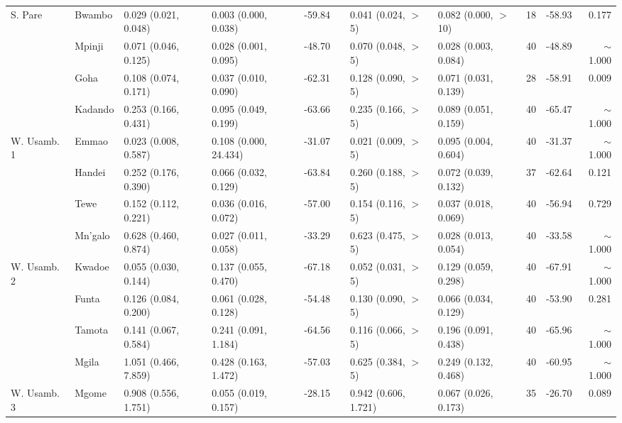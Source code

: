 \begin{tabular}{llllllllclr}
\cmidrule{2-11}
S. Pare     & Bwambo         & 0.029 (0.021, 0.048)   & 0.003 (0.000, 0.038)   & -59.84   & & 0.041 (0.024, $>$5)    & 0.082 (0.000, $>$10)   & 18   & -58.93   & 0.177\\
            & Mpinji         & 0.071 (0.046, 0.125)   & 0.028 (0.001, 0.095)   & -48.70   & & 0.070 (0.048, $>$5)    & 0.028 (0.003, 0.084)   & 40   & -48.89   & $\sim$1.000\\
            & Goha           & 0.108 (0.074, 0.171)   & 0.037 (0.010, 0.090)   & -62.31   & & 0.128 (0.090, $>$5)    & 0.071 (0.031, 0.139)   & 28   & -58.91   & 0.009\\
            & Kadando        & 0.253 (0.166, 0.431)   & 0.095 (0.049, 0.199)   & -63.66   & & 0.235 (0.166, $>$5)    & 0.089 (0.051, 0.159)   & 40   & -65.47   & $\sim$1.000\\
\cmidrule{2-11}
W. Usamb. 1 & Emmao          & 0.023 (0.008, 0.587)   & 0.108 (0.000, 24.434)  & -31.07   & & 0.021 (0.009, $>$5)    & 0.095 (0.004, 0.604)   & 40   & -31.37   & $\sim$1.000\\
            & Handei         & 0.252 (0.176, 0.390)   & 0.066 (0.032, 0.129)   & -63.84   & & 0.260 (0.188, $>$5)    & 0.072 (0.039, 0.132)   & 37   & -62.64   & 0.121\\
            & Tewe           & 0.152 (0.112, 0.221)   & 0.036 (0.016, 0.072)   & -57.00   & & 0.154 (0.116, $>$5)    & 0.037 (0.018, 0.069)   & 40   & -56.94   & 0.729\\
            & Mn'galo        & 0.628 (0.460, 0.874)   & 0.027 (0.011, 0.058)   & -33.29   & & 0.623 (0.475, $>$5)    & 0.028 (0.013, 0.054)   & 40   & -33.58   & $\sim$1.000\\
\cmidrule{2-11}
W. Usamb. 2 & Kwadoe         & 0.055 (0.030, 0.144)   & 0.137 (0.055, 0.470)   & -67.18   & & 0.052 (0.031, $>$5)    & 0.129 (0.059, 0.298)   & 40   & -67.91   & $\sim$1.000\\
            & Funta          & 0.126 (0.084, 0.200)   & 0.061 (0.028, 0.128)   & -54.48   & & 0.130 (0.090, $>$5)    & 0.066 (0.034, 0.129)   & 40   & -53.90   & 0.281\\
            & Tamota         & 0.141 (0.067, 0.584)   & 0.241 (0.091, 1.184)   & -64.56   & & 0.116 (0.066, $>$5)    & 0.196 (0.091, 0.438)   & 40   & -65.96   & $\sim$1.000\\
            & Mgila          & 1.051 (0.466, 7.859)   & 0.428 (0.163, 1.472)   & -57.03   & & 0.625 (0.384, $>$5)    & 0.249 (0.132, 0.468)   & 40   & -60.95   & $\sim$1.000\\
\cmidrule{2-11}
W. Usamb. 3 & Mgome          & 0.908 (0.556, 1.751)   & 0.055 (0.019, 0.157)   & -28.15   & & 0.942 (0.606, 1.721)   & 0.067 (0.026, 0.173)   & 35   & -26.70   & 0.089\\
\bottomrule
\end{tabular}